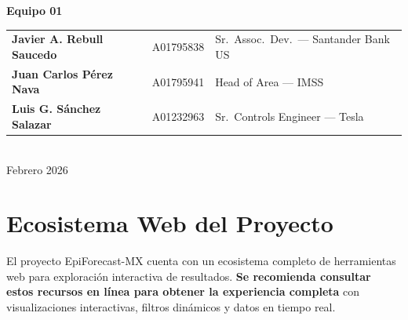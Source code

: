 \documentclass[12pt, letterpaper]{article}
\begin{document}
\begin{titlepage}
\begin{center}
\textbf{\Large Equipo 01}\\[0.4cm]
\begin{tabular}{lll}
\textbf{Javier A. Rebull Saucedo} & A01795838 & Sr.\ Assoc.\ Dev.\ — Santander Bank US \\
\textbf{Juan Carlos Pérez Nava}   & A01795941 & Head of Area — IMSS \\
\textbf{Luis G. Sánchez Salazar}  & A01232963 & Sr.\ Controls Engineer — Tesla \\
\end{tabular}\\[1.0cm]

{\large Febrero 2026}

\end{center}
\end{titlepage}

\newpage
\tableofcontents
\newpage

\section{Ecosistema Web del Proyecto}\label{sec:ecosistema}

El proyecto EpiForecast-MX cuenta con un ecosistema completo de herramientas web para exploración interactiva de resultados. \textbf{Se recomienda consultar estos recursos en línea para obtener la experiencia completa} con visualizaciones interactivas, filtros dinámicos y datos en tiempo real.
\end{document}
